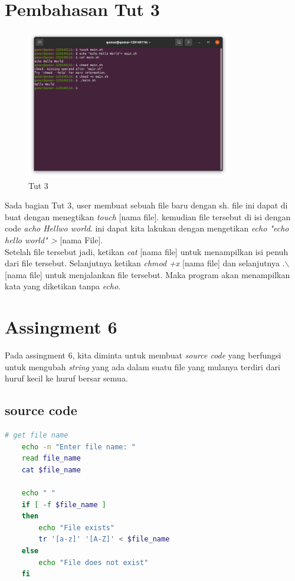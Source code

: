 \documentclass[11pt,a4paper]{article}
\begin{document}
\section{Pembahasan Tut 3}
\begin{figure}[h]
	\centering
	\includegraphics[width=0.8\textwidth ]{figure/tut3.png}
	\caption{Tut 3}
\end{figure}
	Sada bagian Tut 3, user membuat sebuah file baru dengan sh. file ini dapat di buat dengan menegtikan \textit{touch} [nama file]. kemudian file tersebut di isi dengan code \textit{acho Hellwo world}. ini dapat kita lakukan dengan mengetikan \textit{echo "echo hello world" >} [nama File].\\
	Setelah file tersebut jadi, ketikan \textit{cat} [nama file] untuk menampilkan isi penuh dari file tersebut.
	Selanjutnya ketikan \textit{chmod +x } [nama file] dan selanjutnya .$\backslash$ [nama file] untuk menjalankan file tersebut. Maka program akan menampilkan kata yang diketikan tanpa \textit{echo}.

\newpage
\section{Assingment 6}
Pada assingment 6, kita diminta untuk membuat \textit{source code} yang berfungsi untuk mengubah \textit{string} yang ada dalam suatu file yang mulanya terdiri dari huruf kecil ke
huruf bersar semua.
\subsection*{source code}
\begin{lstlisting}[language=bash, caption={source code Assingment 6}]
	# get file name
	echo -n "Enter file name: "
	read file_name
	cat $file_name

	echo " "
	if [ -f $file_name ]
	then
		echo "File exists"
		tr '[a-z]' '[A-Z]' < $file_name
	else
		echo "File does not exist"
	fi

\end{lstlisting}
\end{document}
